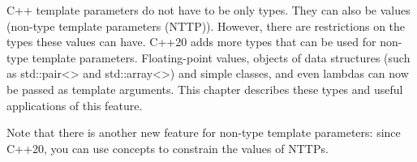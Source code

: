 C++ template parameters do not have to be only types. They can also be values (non-type template parameters (NTTP)). However, there are restrictions on the types these values can have. C++20 adds more types that can be used for non-type template parameters. Floating-point values, objects of data structures (such as std::pair<> and std::array<>) and simple classes, and even lambdas can now be passed as template arguments. This chapter describes these types and useful applications of this feature.

Note that there is another new feature for non-type template parameters: since C++20, you can use concepts to constrain the values of NTTPs.